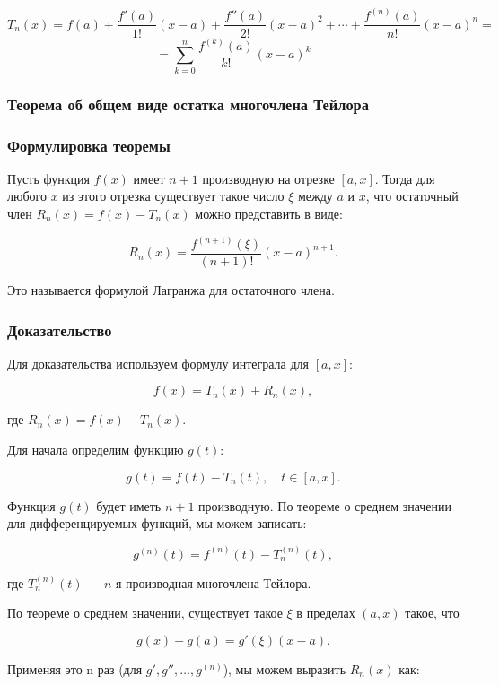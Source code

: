 \[
T_n(x) = f(a) + \frac{f'(a)}{1!}(x-a) + \frac{f''(a)}{2!}(x-a)^2 + \cdots + \frac{f^{(n)}(a)}{n!}(x-a)^n =
\]
\[
    = \sum_{k=0}^{n} \frac{f^{(k)}(a)}{k!}(x-a)^k
\]





\subsubsection{Теорема об общем виде остатка многочлена Тейлора}


\subsubsection*{Формулировка теоремы}

Пусть функция \( f(x) \) имеет \( n+1 \) производную на отрезке \( [a, x] \). Тогда для любого \( x \) из этого отрезка существует такое число \( \xi \) между \( a \) и \( x \), что остаточный член \( R_n(x) = f(x) - T_n(x) \) можно представить в виде:

\[
R_n(x) = \frac{f^{(n+1)}(\xi)}{(n+1)!} (x-a)^{n+1}.
\]

Это называется формулой Лагранжа для остаточного члена.

\subsubsection*{Доказательство}

Для доказательства используем формулу интеграла для \( [a, x] \):

\[
f(x) = T_n(x) + R_n(x),
\]

где \( R_n(x) = f(x) - T_n(x) \).

Для начала определим функцию \( g(t) \):

\[
g(t) = f(t) - T_n(t), \quad t \in [a,x].
\]

Функция \( g(t) \) будет иметь \( n+1 \) производную. По теореме о среднем значении для дифференцируемых функций, мы можем записать:

\[
g^{(n)}(t) = f^{(n)}(t) - T_n^{(n)}(t),
\]

где \( T_n^{(n)}(t) \) — \( n \)-я производная многочлена Тейлора. 

По теореме о среднем значении, существует такое \( \xi \) в пределах \( (a, x) \) такое, что

\[
g(x) - g(a) = g'(\xi)(x-a).
\]

Применяя это n раз (для \( g', g'', \ldots, g^{(n)} \)), мы можем выразить \( R_n(x) \) как:

